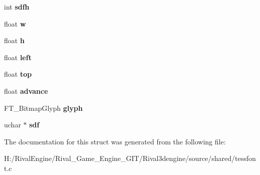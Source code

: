\begin{DoxyCompactItemize}
int {\bfseries sdfh}
\item 
\mbox{\label{structfontchar_a086485155f05cb86a2e44d60dbf4634c}} 
float {\bfseries w}
\item 
\mbox{\label{structfontchar_a159d9cbcba1fe394ac736f3a9f6971f9}} 
float {\bfseries h}
\item 
\mbox{\label{structfontchar_aff0af280b7203e045ba5910e60b2b27c}} 
float {\bfseries left}
\item 
\mbox{\label{structfontchar_ae7d031a9ba0b4b84b9b216ecbac3b456}} 
float {\bfseries top}
\item 
\mbox{\label{structfontchar_a39f4f3e3675bbe4a59d242d7daa03057}} 
float {\bfseries advance}
\item 
\mbox{\label{structfontchar_af4a234a7ee03abb3f3696739d31d9f8c}} 
F\+T\+\_\+\+Bitmap\+Glyph {\bfseries glyph}
\item 
\mbox{\label{structfontchar_ae2fad7dd8115c16822a9efba4fe13809}} 
uchar $\ast$ {\bfseries sdf}
\end{DoxyCompactItemize}


The documentation for this struct was generated from the following file\+:\begin{DoxyCompactItemize}
\item 
H\+:/\+Rival\+Engine/\+Rival\+\_\+\+Game\+\_\+\+Engine\+\_\+\+G\+I\+T/\+Rival3dengine/source/shared/tessfont.\+c\end{DoxyCompactItemize}
